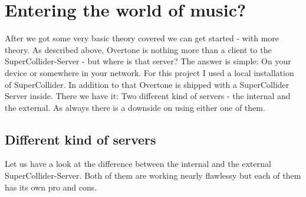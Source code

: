 \chapter{Entering the world of music?}
After we got some very basic theory covered we can get started - with more theory. As described above, Overtone is nothing more than a client to the SuperCollider-Server - but where is that server? The answer is simple: On your device or somewhere in your network.
For this project I used a local installation of SuperCollider. In addition to that Overtone is shipped with a SuperCollider Server inside. There we have it: Two different kind of servers - the internal and the external. As always there is a downside on using either one of them.

\section{Different kind of servers}
Let us have a look at the difference between the internal and the external SuperCollider-Server. Both of them are working nearly flawlessy but each of them has its own pro and cons.
